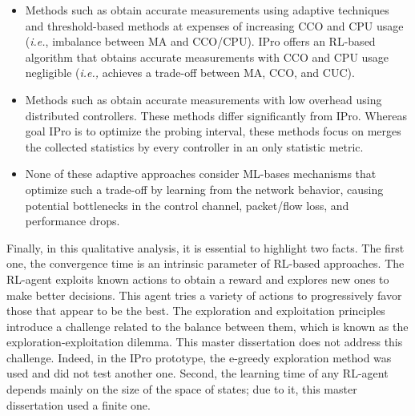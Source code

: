 \begin{itemize}
    \item Methods such as \cite{chowdhury_2014:payless, raumer_2014:monsamp, van_2014:OpenNetMon} obtain accurate measurements using adaptive techniques and threshold-based methods at expenses of increasing CCO and CPU usage (\textit{i.e.}, imbalance between MA and CCO/CPU). IPro offers an RL-based algorithm that obtains accurate measurements with CCO and CPU usage negligible (\textit{i.e.,} achieves a trade-off between MA, CCO, and CUC).
    
    \item Methods such as \cite{jose_2011:online_measurement, Tangari_2018:adaptive_decentralized_monitoring, phan2017:adaptive_sdn_mon, tahaei_2018:cost_effective} obtain accurate measurements with low overhead using distributed controllers. These methods differ significantly from IPro. Whereas goal IPro is to optimize the probing interval, these methods focus on merges the collected statistics by every controller in an only statistic metric. 
    
    \item None of these adaptive approaches consider ML-bases mechanisms that optimize such a trade-off by learning from the network behavior, causing potential bottlenecks in the control channel, packet/flow loss, and performance drops.
\end{itemize}{}

Finally, in this qualitative analysis, it is essential to highlight two facts. The first one, the convergence time is an intrinsic parameter of RL-based approaches. The RL-agent exploits known actions to obtain a reward and explores new ones to make better decisions. This agent tries a variety of actions to progressively favor those that appear to be the best. The exploration and exploitation principles introduce a challenge related to the balance between them, which is known as the exploration-exploitation dilemma. This master dissertation does not address this challenge. Indeed, in the IPro prototype,  the e-greedy exploration method was used and did not test another one. Second, the learning time of any RL-agent depends mainly on the size of the space of states; due to it, this master dissertation used a finite one.
